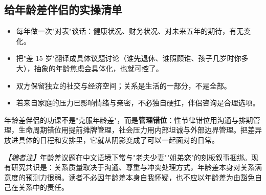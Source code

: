 \subsection{给年龄差伴侣的实操清单}

\begin{itemize}
\item 每年做一次"对表"谈话：健康状况、财务状况、对未来五年的期待，有无变化。
\item 把"差 15 岁"翻译成具体议题讨论（谁先退休、谁照顾谁、孩子几岁时你多大），抽象的年龄焦虑会具体化，也就可控了。
\item 双方保留独立的社交与经济空间；关系是生活的一部分，不是全部。
\item 若来自家庭的压力已影响情绪与亲密，不必独自硬扛，伴侣咨询是合理选项。
\end{itemize}

\begin{tcolorbox}[colback=pink!5!white,colframe=red!50!black,title=核心原则]
年龄差伴侣的功课不是"克服年龄差"，而是\textbf{管理错位}：性节律错位用沟通与排期管理，生命周期错位用提前摊牌管理，社会压力用内部坦诚与外部边界管理。把差异放进具体的日程和安排里，它就从阴影变成了可以一起面对的日常。
\end{tcolorbox}

\noindent\textit{【编者注】}年龄差议题在中文语境下常与"老夫少妻""姐弟恋"的刻板叙事捆绑。现有研究共识是：关系质量取决于沟通、尊重与冲突处理方式，年龄差本身对关系满意度的预测力很弱。读者不必因年龄差本身自我怀疑，也不应以年龄差为由豁免自己在关系中的责任。
